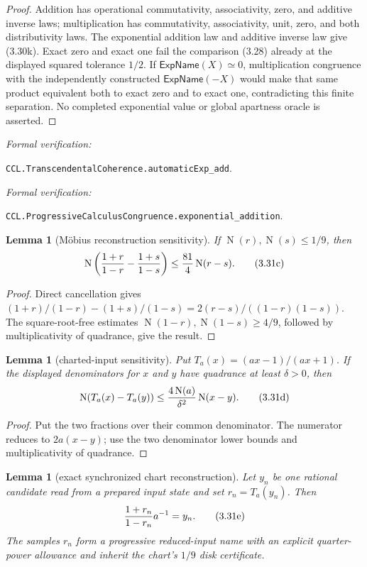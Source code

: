 \documentclass[10pt]{article}
\newtheorem{lemma}[theorem]{Lemma}
\theoremstyle{definition}
\theoremstyle{remark}
\newcommand{\Norm}{\operatorname{N}}
\newcommand{\leanref}[1]{\par\smallskip\noindent
  \emph{Formal verification:}\par\nobreak
  {\raggedright\nolinkurl{#1}.\par}}
\begin{document}
\begin{proof}
Addition has operational commutativity, associativity, zero, and additive
inverse laws; multiplication has commutativity, associativity, unit, zero,
and both distributivity laws.  The exponential addition law and additive
inverse law give (3.30k).  Exact zero
and exact one fail the comparison (3.28) already at the displayed squared
tolerance $1/2$.  If $\mathsf{ExpName}(X)\simeq0$, multiplication congruence
with the independently constructed $\mathsf{ExpName}(-X)$ would make that
same product equivalent both to exact zero and to exact one, contradicting
this finite separation.  No completed exponential value or global
apartness oracle is asserted.
\end{proof}

\leanref{CCL.TranscendentalCoherence.automaticExp_add}
\leanref{CCL.ProgressiveCalculusCongruence.exponential_addition}

\begin{lemma}[M\"obius reconstruction sensitivity]
If $\Norm(r),\Norm(s)\le1/9$, then
\[
 \Norm\left({1+r\over1-r}-{1+s\over1-s}\right)
 \le {81\over4}\Norm(r-s).
\tag{3.31c}
\]
\end{lemma}

\begin{proof}
Direct cancellation gives
$(1+r)/(1-r)-(1+s)/(1-s)=2(r-s)/((1-r)(1-s))$.
The square-root-free estimates $\Norm(1-r),\Norm(1-s)\ge4/9$, followed by
multiplicativity of quadrance, give the result.
\end{proof}

\begin{lemma}[charted-input sensitivity]
Put $T_a(x)=(ax-1)/(ax+1)$.  If the displayed denominators for $x$ and $y$
have quadrance at least $\delta>0$, then
\[
 \Norm(T_a(x)-T_a(y))
 \le {4\Norm(a)\over\delta^2}\Norm(x-y).
\tag{3.31d}
\]
\end{lemma}

\begin{proof}
Put the two fractions over their common denominator.  The numerator reduces
to $2a(x-y)$; use the two denominator lower bounds and multiplicativity of
quadrance.
\end{proof}

\begin{lemma}[exact synchronized chart reconstruction]
Let $y_n$ be one rational candidate read from a prepared input state and set
$r_n=T_a(y_n)$.  Then
\[
 {1+r_n\over1-r_n}a^{-1}=y_n.
\tag{3.31e}
\]
The samples $r_n$ form a progressive reduced-input name with an explicit
quarter-power allowance and inherit the chart's $1/9$ disk certificate.
\end{lemma}
\end{document}
